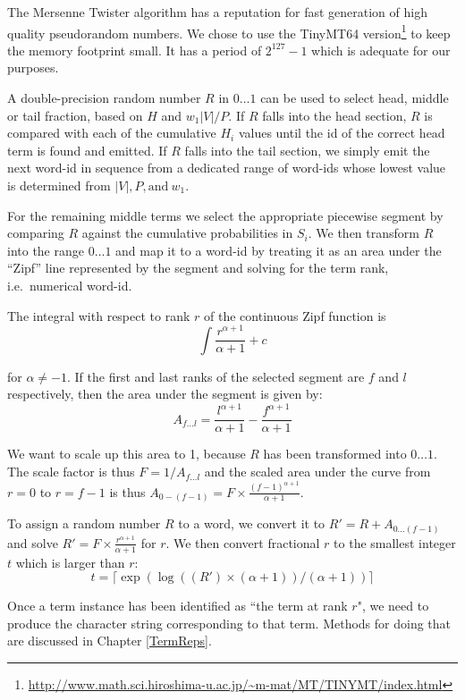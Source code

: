 \documentclass[11pt]{report}
\begin{document}
The Mersenne Twister \cite{MatsumotoN1998} algorithm has a reputation for fast
generation of high quality pseudorandom numbers.  We chose to use the 
TinyMT64
version\footnote{\url{http://www.math.sci.hiroshima-u.ac.jp/~m-mat/MT/TINYMT/index.html}}
to keep the memory footprint small.  It has a period of $2^{127}-1$
which is adequate for our purposes.  

A double-precision random number $R$ in $0\ldots1$ can be used to select head, middle
or tail fraction, based on $H$ and $w_1|V|/P$. If $R$ falls into the head
section, $R$ is compared with each of the cumulative $H_i$ values until the id of
the correct head term is found and emitted. If $R$ falls into the tail
section, we simply emit the next word-id in sequence from a dedicated
range of word-ids whose lowest value is determined from $|V|, P,
\mathrm{and}~w_1$.

For the remaining middle terms we select the appropriate piecewise
segment by comparing $R$ against the cumulative probabilities in $S_i$.
We then transform $R$ into the range $0\ldots1$ and map it to a
word-id by treating it as an area under the ``Zipf'' line represented
by the segment and solving for the term rank, i.e.~numerical word-id.

The integral with respect to rank $r$ of the continuous Zipf function is
\[
\int \frac{r^{\alpha + 1}}{\alpha + 1} + c
\]

for $\alpha \neq -1$.  If the first and last ranks of the 
selected segment are $f$ and $l$ respectively, then the 
area under the segment is given by:
\[
A_{f\ldots l} = \frac{l^{\alpha + 1}}{\alpha + 1} - \frac{f^{\alpha
    + 1}}{\alpha + 1} 
\]

We want to scale up this area to 1, because $R$ has been transformed
into $0 \ldots 1$.  The scale factor is thus $F = 1 / A_{f\ldots l}$
and the scaled area under the curve from $r=0$ to $r = f-1$ is thus
$A_{0-(f-1)} = F \times \frac{(f-1)^{\alpha + 1}}{\alpha + 1}$.

To assign a random number $R$ to a word, we convert it to $R' = R +
A_{0 \ldots (f-1)}$ and solve $R' = F \times \frac{r^{\alpha + 1}}{\alpha + 1}$
for $r$.  We then convert fractional $r$ to the smallest integer
$t$ which is larger than $r$:
\[
t = \lceil{\exp(\log((R') \times (\alpha + 1)) / (\alpha + 1))}\rceil
\]

Once a term instance has been identified as ``the term at rank $r$", we
need to produce the character string corresponding to that term.
Methods for doing that are discussed in Chapter \ref{TermReps}.
\end{document}
